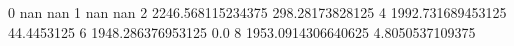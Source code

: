 0 nan nan
1 nan nan
2 2246.568115234375 298.28173828125
4 1992.731689453125 44.4453125
6 1948.286376953125 0.0
8 1953.0914306640625 4.8050537109375
